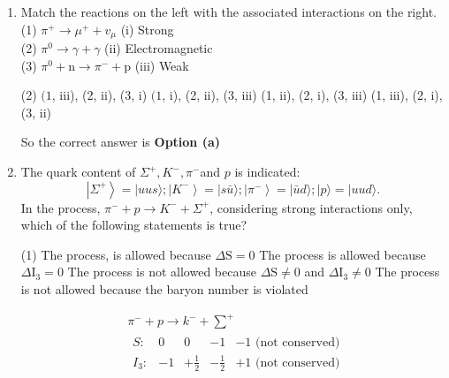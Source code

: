 \begin{enumerate}
\begin{answer}
	So the correct answer is \textbf{Option (a)}
\end{answer}
	\item  Match the reactions on the left with the associated interactions on the right.\\
	(1) $\pi^{+} \rightarrow \mu^{+}+v_\mu$\hspace{3cm}
	(i) Strong\\
	(2) $\pi^0 \rightarrow \gamma+\gamma$\hspace{3.5cm}
	(ii) Electromagnetic\\
	(3) $\pi^0+\mathrm{n} \rightarrow \pi^{-}+\mathrm{p}$\hspace{2.6cm}
	(iii) Weak
	{}
	 \begin{tasks}(2)
		\task[\textbf{a.}]$(1$, iii), (2, ii), (3, i)
		\task[\textbf{b.}]$(1$, i), (2, ii), (3, iii)
		\task[\textbf{c.}](1, ii), (2, i), (3, iii)
		\task[\textbf{d.}](1, iii), (2, i), (3, ii) 
	\end{tasks}
\begin{answer}
	So the correct answer is \textbf{Option (a)}
\end{answer}
	\item  The quark content of $\Sigma^{+}, K^{-}, \pi^{-}$and $p$ is indicated:
	$$
	\left|\Sigma^{+}\right\rangle=|u u s\rangle ;\left|K^{-}\right\rangle=|s \bar{u}\rangle ;\left|\pi^{-}\right\rangle=|\bar{u} d\rangle ;|p\rangle=|u u d\rangle .
	$$
	In the process, $\pi^{-}+p \rightarrow K^{-}+\Sigma^{+}$, considering strong interactions only, which of the following statements is true?
	{}
	 \begin{tasks}(1)
		\task[\textbf{a.}]The process, is allowed because $\Delta \mathrm{S}=0$
		\task[\textbf{b.}] The process is allowed because $\Delta \mathrm{I}_3=0$
		\task[\textbf{c.}] The process is not allowed because $\Delta \mathrm{S} \neq 0$ and $\Delta \mathrm{I}_3 \neq 0$
		\task[\textbf{d.}]The process is not allowed because the baryon number is violated 
	\end{tasks}
\begin{answer}
	\begin{align*}
	&\pi^{-}+p \rightarrow k^{-}+\sum^{+}\\
	&\begin{array}{ccccc}
	S: & 0 & 0 & -1 & -1 \text { (not conserved) } \\
	I_3: & -1 & +\frac{1}{2} & -\frac{1}{2} & +1 \text { (not conserved) }
	\end{array}\\

\end{align*}
\end{answer}
\end{enumerate}
